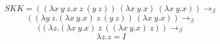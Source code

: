 \documentclass{article}
\begin{document}
\Large$$SKK = ((\lambda x\ y\ z.x\ z\ (y\ z))\ (\lambda x\ y.x)\ (\lambda x\ y.x))\rightarrow_\beta$$
$$((\lambda y\ z.(\lambda x\ y.x)\ z\ (y\ z))\ (\lambda x\ y.x)) \rightarrow_\beta$$
$$((\lambda z.(\lambda x\ y.x)\ z\ ((\lambda x\ y.x)\ z)) \rightarrow_\beta$$
$$\lambda z.z = I$$
\end{document}
